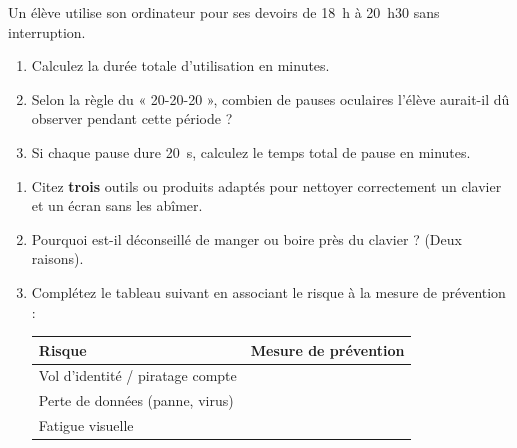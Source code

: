 \documentclass[11pt]{article}
\begin{document}
\begin{exercice}
Un élève utilise son ordinateur pour ses devoirs de \SI{18}{h} à \SI{20}{h}30 sans interruption.
\begin{enumerate}
    \item Calculez la durée totale d'utilisation en minutes.
    \item Selon la règle du « 20-20-20 », combien de pauses oculaires l'élève aurait-il dû observer pendant cette période ?
    \item Si chaque pause dure \SI{20}{\second}, calculez le temps total de pause en minutes.
\end{enumerate}
\end{exercice}

\begin{exercice}
\begin{enumerate}
    \item Citez \textbf{trois} outils ou produits adaptés pour nettoyer correctement un clavier et un écran sans les abîmer.
    \item Pourquoi est-il déconseillé de manger ou boire près du clavier ? (Deux raisons).
    \item Complétez le tableau suivant en associant le risque à la mesure de prévention :
    \begin{tabular}{|p{5cm}|p{10cm}|}
    \hline
    \textbf{Risque} & \textbf{Mesure de prévention} \\ \hline
    Vol d'identité / piratage compte & \underline{\hspace{9.5cm}} \\ \hline
    Perte de données (panne, virus) & \underline{\hspace{9.5cm}} \\ \hline
    Fatigue visuelle & \underline{\hspace{9.5cm}} \\ \hline
    \end{tabular}
\end{enumerate}
\end{exercice}
\end{document}
